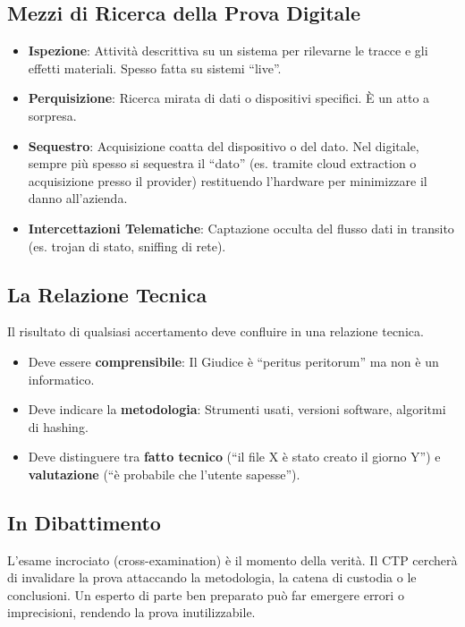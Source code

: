 \documentclass[11pt,a4paper]{article}
\begin{document}
\subsection{Mezzi di Ricerca della Prova Digitale}
\begin{itemize}
    \item \textbf{Ispezione}: Attività descrittiva su un sistema per rilevarne le tracce e gli effetti materiali. Spesso fatta su sistemi ``live''.
    \item \textbf{Perquisizione}: Ricerca mirata di dati o dispositivi specifici. È un atto a sorpresa.
    \item \textbf{Sequestro}: Acquisizione coatta del dispositivo o del dato. Nel digitale, sempre più spesso si sequestra il ``dato'' (es. tramite cloud extraction o acquisizione presso il provider) restituendo l'hardware per minimizzare il danno all'azienda.
    \item \textbf{Intercettazioni Telematiche}: Captazione occulta del flusso dati in transito (es. trojan di stato, sniffing di rete).
\end{itemize}

\subsection{La Relazione Tecnica}
Il risultato di qualsiasi accertamento deve confluire in una relazione tecnica.
\begin{itemize}
    \item Deve essere \textbf{comprensibile}: Il Giudice è ``peritus peritorum'' ma non è un informatico.
    \item Deve indicare la \textbf{metodologia}: Strumenti usati, versioni software, algoritmi di hashing.
    \item Deve distinguere tra \textbf{fatto tecnico} (``il file X è stato creato il giorno Y'') e \textbf{valutazione} (``è probabile che l'utente sapesse'').
\end{itemize}

\subsection{In Dibattimento}
L'esame incrociato (cross-examination) è il momento della verità. 
Il CTP cercherà di invalidare la prova attaccando la metodologia, la catena di custodia o le conclusioni. 
Un esperto di parte ben preparato può far emergere errori o imprecisioni, rendendo la prova inutilizzabile.
\end{document}
